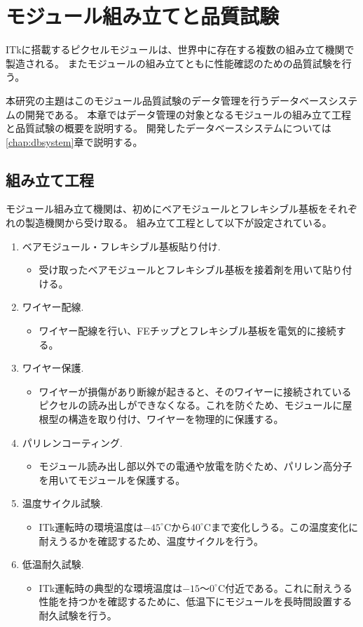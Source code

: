 \chapter{モジュール組み立てと品質試験} \label{chap:qc_test}
ITkに搭載するピクセルモジュールは、世界中に存在する複数の組み立て機関で製造される。
またモジュールの組み立てともに性能確認のための品質試験を行う。

本研究の主題はこのモジュール品質試験のデータ管理を行うデータベースシステムの開発である。
本章ではデータ管理の対象となるモジュールの組み立て工程と品質試験の概要を説明する。
開発したデータベースシステムについては\ref{chap:dbsystem}章で説明する。

\section{組み立て工程}\label{sec:assembly}
モジュール組み立て機関は、初めにベアモジュールとフレキシブル基板をそれぞれの製造機関から受け取る。
組み立て工程として以下が設定されている。
\begin{enumerate}
  \item ベアモジュール・フレキシブル基板貼り付け.
  \begin{itemize}
    \item 受け取ったベアモジュールとフレキシブル基板を接着剤を用いて貼り付ける。
  \end{itemize}
  \item ワイヤー配線.
  \begin{itemize}
    \item ワイヤー配線を行い、FEチップとフレキシブル基板を電気的に接続する。
  \end{itemize}
  \item ワイヤー保護.
  \begin{itemize}
    \item ワイヤーが損傷があり断線が起きると、そのワイヤーに接続されているピクセルの読み出しができなくなる。これを防ぐため、モジュールに屋根型の構造を取り付け、ワイヤーを物理的に保護する。
  \end{itemize}
  \item パリレンコーティング.
  \begin{itemize}
    \item モジュール読み出し部以外での電通や放電を防ぐため、パリレン高分子を用いてモジュールを保護する。
  \end{itemize}
  \item 温度サイクル試験.
  \begin{itemize}
    \item ITk運転時の環境温度は$-45^\circ$Cから$40^\circ$Cまで変化しうる\cite{3-2}。この温度変化に耐えうるかを確認するため、温度サイクルを行う。
  \end{itemize}
  \item 低温耐久試験.
  \begin{itemize}
    \item ITk運転時の典型的な環境温度は$-15〜0^\circ$C付近である。これに耐えうる性能を持つかを確認するために、低温下にモジュールを長時間設置する耐久試験を行う。
  \end{itemize}
\end{enumerate}

